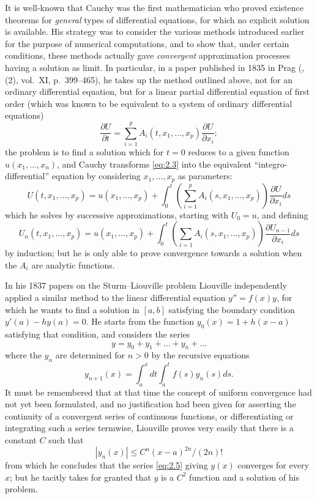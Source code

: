 \documentclass[12pt,a4paper,leqno,twoside]{extbook}
\newcommand{\pder}[2]{\frac{\partial #1}{\partial #2}}
\begin{document}
It is well-known that Cauchy was the first mathematician who proved existence theorems for \emph{general} types of differential equations, for which no explicit solution is available. His strategy was to consider the various methods introduced earlier for the purpose of numerical computations, and to show that, under certain conditions, these methods actually gave \emph{convergent} approximation processes having a solution as limit. In particular, in a paper published in 1835 in Prag (\cite{040}, (2), vol.~XI, p.~399--465), he takes up the method outlined above, not for an ordinary differential equation, but for a linear partial differential equation of first order (which was known to be equivalent to a system of ordinary differential equations)
\begin{equation}
    \label{eq:2.3}
    \pder{U}{t} = \sum_{i=1}^p A_i(t, x_1, \ldots, x_p) \pder{U}{x_i};
\end{equation}
the problem is to find a solution which for \(t=0\) reduces to a given function \(u(x_1, \ldots,x_n)\), and Cauchy transforms \eqref{eq:2.3} into the equivalent ``integro-differential'' equation by considering \(x_1, \ldots, x_p\) as parameters:
\begin{equation}
    \label{eq:2.4}
    U(t, x_1, \ldots, x_p) = u(x_1, \ldots, x_p) + \int_0^t \left( \sum_{i=1}^p A_i(s, x_1, \ldots, x_p) \right) \pder{U}{x_i} ds
\end{equation}
which he solves by successive approximations, starting with \(U_0 = u\), and defining
\[
    U_n(t, x_1, \ldots, x_p) = u(x_1, \ldots, x_p) + \int_0^t \left( \sum_{i=1} A_i(s, x_1, \ldots, x_p) \right) \pder{U_{n-1}}{x_i} ds
\]
by induction; but he is only able to prove convergence towards a solution when the \(A_i\) are analytic functions.

In his 1837 papers on the Sturm--Liouville problem Liouville independently applied a similar method to the linear differential equation \(y'' = f(x)y\), for which he wants to find a solution in \([a,b]\) satisfying the boundary condition \(y'(a) - hy(a) = 0\). He starts from the function \(y_0(x) = 1+h(x-a)\) satisfying that condition, and considers the series
\begin{equation}
    \label{eq:2.5}
    y = y_0 + y_1 + \ldots + y_n + \ldots
\end{equation}
where the \(y_n\) are determined for \(n > 0\) by the recursive equations
\[
    y_{n+1}(x) = \int_a^x dt \int_a^t f(s)y_n(s)ds.
\]
It must be remembered that at that time the concept of uniform convergence had not yet been formulated, and no justification had been given for asserting the continuity of a convergent series of continuous functions, or differentiating or integrating such a series termwise, Liouville proves very easily that there is a constant \(C\) such that
\[
    \left| y_n(x) \right| \leq C^n(x-a)^{2n} / (2n)!
\]
from which he concludes that the series \eqref{eq:2.5} giving \(y(x)\) converges for every \(x\); but he tacitly takes for granted that \(y\) is a \(C^2\) function and a solution of his problem.
\end{document}
